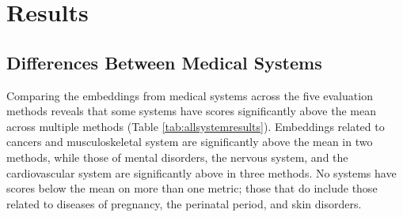 \documentclass[10pt]{article}
\begin{document}
\section{Results}

\subsection{Differences Between Medical Systems}

Comparing the embeddings from medical systems across the five evaluation methods reveals that some systems have scores significantly above the mean across multiple methods (Table \ref{tab:allsystemresults}). Embeddings related to cancers and musculoskeletal system are significantly above the mean in two methods, while those of mental disorders, the nervous system, and the cardiovascular system are significantly above in three methods. No systems have scores below the mean on more than one metric; those that do include those related to diseases of pregnancy, the perinatal period, and skin disorders. 
\end{document}
